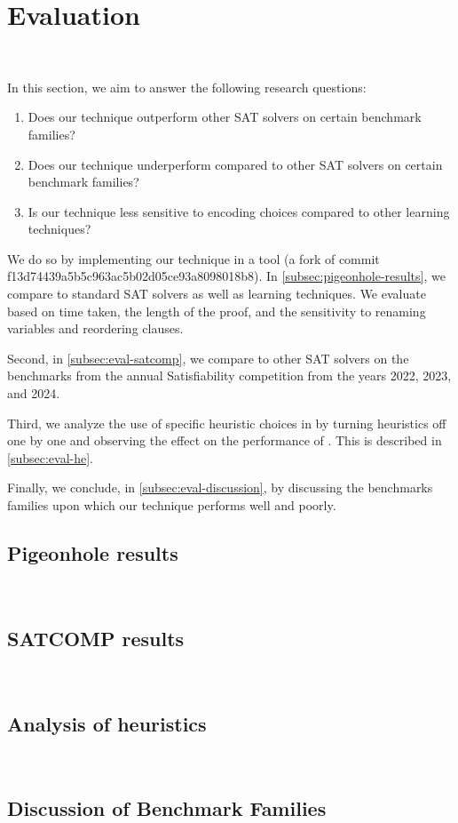 \section{Evaluation}~\label{sec:evaluation}

In this section, we aim to answer the following research questions:


\begin{enumerate}
    \item Does our technique outperform other SAT solvers on certain benchmark
    families?
    \item Does our technique underperform compared to other SAT solvers on
    certain benchmark families?
    \item Is our technique less sensitive to encoding choices compared to other
    \pr learning techniques?
\end{enumerate}

We do so by implementing our technique in a tool \tool (a fork of \cadical
commit f13d74439a5b5c963ac5b02d05ce93a8098018b8). In
\autoref{subsec:pigeonhole-results}, we compare \tool to standard SAT solvers as
well as \pr learning techniques. We evaluate based on time taken, the length of
the proof, and the sensitivity to renaming variables and reordering clauses.

Second, in \autoref{subsec:eval-satcomp}, we compare \tool to other SAT solvers
on the benchmarks from the annual Satisfiability competition from the years
2022, 2023, and 2024. 

Third, we analyze the use of specific heuristic choices in \tool by turning
heuristics off one by one and observing the effect on the performance of \tool.
This is described in \autoref{subsec:eval-he}.

Finally, we conclude, in \autoref{subsec:eval-discussion}, by discussing the
benchmarks families upon which our technique performs well and poorly.


\subsection{Pigeonhole results}~\label{subsec:evaluation-pigeonhole}

\subsection{SATCOMP results}~\label{subsec:eval-satcomp}

\subsection{Analysis of heuristics}~\label{subsec:eval-heuristics}

\subsection{Discussion of Benchmark Families}~\label{subsec:eval-discussion}